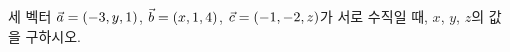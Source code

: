 세 벡터 $\vec{a}=(-3{,}\mkern3mu\mathopen{}y{,}\mkern3mu\mathopen{}1)$, $\vec{b}=(x{,}\mkern3mu\mathopen{}1{,}\mkern3mu\mathopen{}4)$, $\vec{c}=(-1{,}\mkern3mu\mathopen{}-2{,}\mkern3mu\mathopen{}z)$가 서로 수직일 때, $x$, $y$, $z$의 값을 구하시오.
